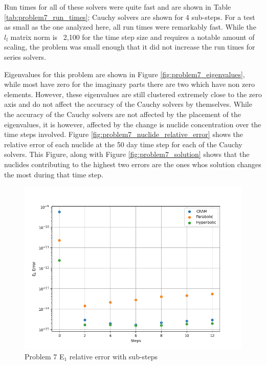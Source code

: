 Run times for all of these solvers were quite fast and are shown in Table \ref{tab:problem7_run_times}; Cauchy solvers are shown for 4 sub-steps. For a test as small as the one analyzed here, all run times were remarkably fast. While the $l_{l}$ matrix norm is ~2,100 for the time step size and requires a notable amount of scaling, the problem was small enough that it did not increase the run times for series solvers. 

Eigenvalues for this problem are shown in Figure \ref{fig:problem7_eigenvalues}, while most have zero for the imaginary parts there are two which have non zero elements. However, these eigenvalues are still clustered extremely close to the zero axis and do not affect the accuracy of the Cauchy solvers by themselves. While the accuracy of the Cauchy solvers are not affected by the placement of the eigenvalues, it is however, affected by the change is nuclide concentration over the time steps involved. Figure \ref{fig:problem7_nuclide_relative_error} shows the relative error of each nuclide at the 50 day time step for each of the Cauchy solvers. This Figure, along with Figure \ref{fig:problem7_solution} shows that the nuclides contributing to the highest two errors are the ones whos solution changes the most during that time step. 

\clearpage

\begin{figure}[p]
    \centering
    \includegraphics[width=6in]{images/chapter-5/progressionProblems/problem7/problem7E1ErrorWithSteps.png}
    \caption{Problem 7 E${}_{1}$ relative error with sub-steps}
    \label{fig:problem7_E1_error_with_steps}
\end{figure}

